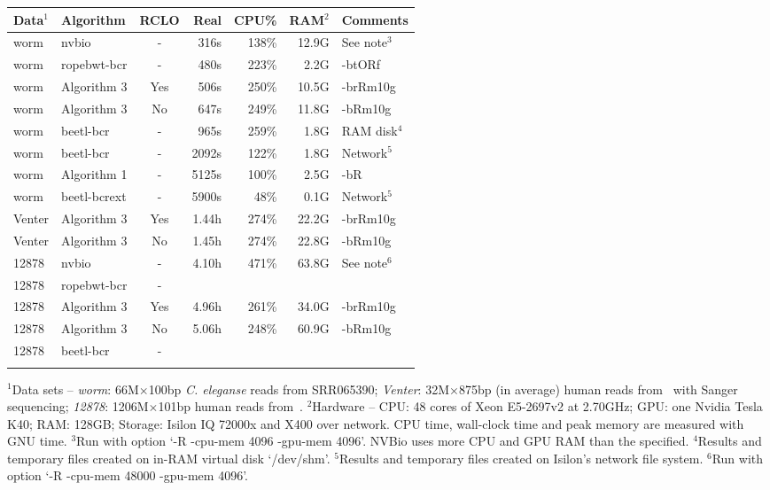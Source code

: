 \documentclass{bioinfo}
\begin{document}
\begin{table}[b]
{\footnotesize
\begin{tabular}{llcrrrl}
\toprule
Data$^1$& Algorithm&RCLO& Real  & CPU\% &RAM$^2$& Comments\\
\midrule
worm & nvbio       & -  & 316s  & 138\%&12.9G & See note$^3$\\
worm & ropebwt-bcr & -  & 480s  & 223\%&2.2G & -btORf\\
worm & Algorithm 3 & Yes& 506s  & 250\%&10.5G & -brRm10g \\
worm & Algorithm 3 & No & 647s  & 249\%&11.8G & -bRm10g \\
worm & beetl-bcr   & -  & 965s  & 259\%&1.8G & RAM disk$^4$\\
worm & beetl-bcr   & -  & 2092s & 122\%&1.8G & Network$^5$\\
worm & Algorithm 1 & -  & 5125s & 100\%&2.5G & -bR \\
worm & beetl-bcrext& -  & 5900s &  48\%&0.1G & Network$^5$\\
Venter&Algorithm 3 & Yes& 1.44h & 274\%&22.2G & -brRm10g \\
Venter&Algorithm 3 & No & 1.45h & 274\%&22.8G & -bRm10g \\
12878&nvbio        & -  &4.10h  & 471\%&63.8G & See note$^6$\\
12878&ropebwt-bcr  & - \\
12878&Algorithm 3  & Yes&4.96h  & 261\%&34.0G & -brRm10g \\
12878&Algorithm 3  & No &5.06h  & 248\%&60.9G & -bRm10g \\
12878&beetl-bcr    & - \\
\botrule
\end{tabular}}{$^1$Data sets -- {\it worm}: 66M$\times$100bp {\it C. eleganse} reads
from SRR065390; {\it Venter}: 32M$\times$875bp (in average) human reads
from~\citet{Levy:2007uq} with Sanger sequencing; {\it 12878}: 1206M$\times$101bp
human reads from~\citet{Depristo:2011vn}. $^2$Hardware -- CPU: 48 cores of
Xeon E5-2697v2 at 2.70GHz; GPU: one Nvidia Tesla K40; RAM: 128GB; Storage:
Isilon IQ 72000x and X400 over network. CPU time, wall-clock time and peak
memory are measured with GNU time. $^3$Run with option `-R -cpu-mem 4096 -gpu-mem
4096'. NVBio uses more CPU and GPU RAM than the specified. $^4$Results and
temporary files created on in-RAM virtual disk `/dev/shm'. $^5$Results and
temporary files created on Isilon's network file system. $^6$Run with
option `-R -cpu-mem 48000 -gpu-mem 4096'.}
\end{table}
\end{document}
